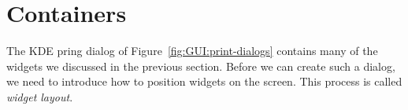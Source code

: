 


\section{Containers}
\label{sec:GUI:basic-components-containers}






The KDE pring dialog of Figure~\ref{fig:GUI:print-dialogs} contains
many of the widgets we discussed in the previous section. Before we
can create such a dialog, we need to introduce how to position widgets
on the screen. This process is called \textit{widget layout}.

